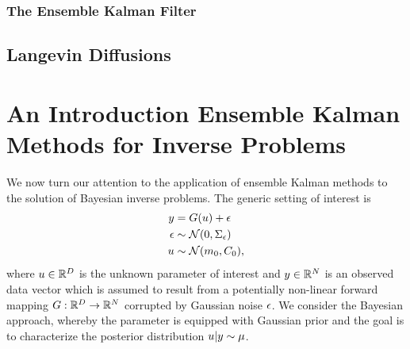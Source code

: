 \documentclass[12pt]{article}
\begin{document}
\subsubsection{The Ensemble Kalman Filter}


\subsection{Langevin Diffusions}

\section{An Introduction Ensemble Kalman Methods for Inverse Problems}
We now turn our attention to the application of ensemble Kalman methods to the solution of Bayesian inverse problems. 
The generic setting of interest is 
\begin{align}
y &= G(u) + \epsilon \label{inverse_problem} \\
\epsilon &\sim \mathcal{N}(0, \Sigma_{\epsilon}) \nonumber \\
u &\sim \mathcal{N}(m_0, C_0), \nonumber
\end{align}
where $u \in \mathbb{R}^{D}$ is the unknown parameter of interest and $y \in \mathbb{R}^{N}$ is an observed 
data vector which is assumed to result from a potentially non-linear forward mapping $G: \mathbb{R}^{D} \to \mathbb{R}^{N}$
corrupted by Gaussian noise $\epsilon$. We consider the Bayesian approach, whereby the parameter is equipped with 
Gaussian prior and the goal is to characterize the posterior distribution $u|y \sim \mu$. 
\end{document}
